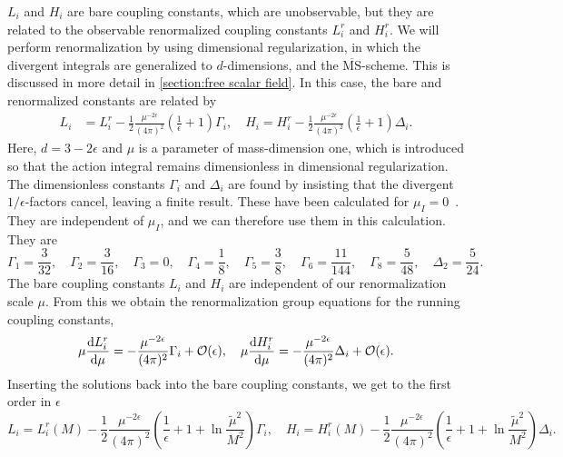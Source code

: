 $L_i$ and $H_i$  are bare coupling constants, which are unobservable, but they are related to the observable renormalized coupling constants $L_i^r$ and $H_i^r$.
We will perform renormalization by using dimensional regularization, in which the divergent integrals are generalized to $d$-dimensions, and the $\overline{\mathrm{MS}}$-scheme.
This is discussed in more detail in \autoref{section:free scalar field}.
In this case, the bare and renormalized constants are related by
%
\begin{align}
    L_i 
    & = 
    L_i^r 
    -
    \frac{1}{2} \frac{\mu^{-2\epsilon}} {(4 \pi)^2}
    \left(\frac{1}{\epsilon} + 1 \right) \Gamma_i, \quad
    H_i = 
    H_i^r
    -  \frac{1}{2}  \frac{\mu^{-2\epsilon}}{(4 \pi)^2} 
    \left(\frac{1}{\epsilon} + 1 \right) \Delta_i .
\end{align}
%
Here, $d = 3 - 2\epsilon$ and $\mu$ is a parameter of mass-dimension one, which is introduced so that the action integral remains dimensionless in dimensional regularization.
The dimensionless constants $\Gamma_i$ and $\Delta_i$ are found by insisting that the divergent $1/\epsilon$-factors cancel, leaving a finite result.
These have been calculated for $\mu_I = 0$~\autocite{gasserChiralPerturbationTheory1985}.
They are independent of $\mu_I$, and we can therefore use them in this calculation.
They are
\begin{equation}
    \Gamma_1 = \frac{3}{32}, \quad
    \Gamma_2 = \frac{3}{16}, \quad
    \Gamma_3 = 0, \quad
    \Gamma_4 = \frac{1}{8}, \quad
    \Gamma_5 = \frac{3}{8}, \quad
    \Gamma_6 = \frac{11}{144}, \quad
    \Gamma_8 = \frac{5}{48}, \quad
    \Delta_2 = \frac{5}{24}.
\end{equation}
%
The bare coupling constants $L_i$ and $H_i$ are independent of our renormalization scale $\mu$.
From this we obtain the renormalization group equations for the running coupling constants,
\begin{equation}
    \mu \diff{L_i^r}{\mu } 
    = - \frac{  \mu^{-2\epsilon} }{(4 \pi)^2} \Gamma_i + \mathcal{O}(\epsilon), \quad
    \mu \diff{H_i^r}{\mu } 
    = - \frac{ \mu^{-2\epsilon}}{(4 \pi)^2} \Delta_i + \mathcal{O}(\epsilon).
\end{equation}
%
Inserting the solutions back into the bare coupling constants, we get to the first order in $\epsilon$
%
\begin{equation}
    L_i
    = 
    L_i^r(M)
    - \frac{1}{2} \frac{\mu^{-2\epsilon}} {(4 \pi)^2}
    \left(\frac{1}{\epsilon} + 1 + \ln{\frac{\tilde \mu^2}{M^2}}\right) \Gamma_i,
    \quad
    H_i
    = 
    H_i^r (M)
    - \frac{1}{2} \frac{\mu^{-2\epsilon}} {(4 \pi)^2}
    \left(\frac{1}{\epsilon} + 1 + \ln{\frac{\tilde \mu^2}{M^2}}\right) \Delta_i.
\end{equation}
